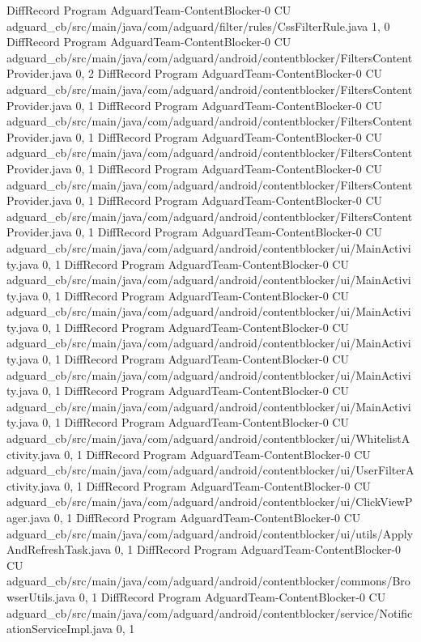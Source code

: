 DiffRecord Program AdguardTeam-ContentBlocker-0 CU adguard_cb/src/main/java/com/adguard/filter/rules/CssFilterRule.java  {1, 0}
DiffRecord Program AdguardTeam-ContentBlocker-0 CU adguard_cb/src/main/java/com/adguard/android/contentblocker/FiltersContentProvider.java  {0, 2}
DiffRecord Program AdguardTeam-ContentBlocker-0 CU adguard_cb/src/main/java/com/adguard/android/contentblocker/FiltersContentProvider.java  {0, 1}
DiffRecord Program AdguardTeam-ContentBlocker-0 CU adguard_cb/src/main/java/com/adguard/android/contentblocker/FiltersContentProvider.java  {0, 1}
DiffRecord Program AdguardTeam-ContentBlocker-0 CU adguard_cb/src/main/java/com/adguard/android/contentblocker/FiltersContentProvider.java  {0, 1}
DiffRecord Program AdguardTeam-ContentBlocker-0 CU adguard_cb/src/main/java/com/adguard/android/contentblocker/FiltersContentProvider.java  {0, 1}
DiffRecord Program AdguardTeam-ContentBlocker-0 CU adguard_cb/src/main/java/com/adguard/android/contentblocker/FiltersContentProvider.java  {0, 1}
DiffRecord Program AdguardTeam-ContentBlocker-0 CU adguard_cb/src/main/java/com/adguard/android/contentblocker/ui/MainActivity.java  {0, 1}
DiffRecord Program AdguardTeam-ContentBlocker-0 CU adguard_cb/src/main/java/com/adguard/android/contentblocker/ui/MainActivity.java  {0, 1}
DiffRecord Program AdguardTeam-ContentBlocker-0 CU adguard_cb/src/main/java/com/adguard/android/contentblocker/ui/MainActivity.java  {0, 1}
DiffRecord Program AdguardTeam-ContentBlocker-0 CU adguard_cb/src/main/java/com/adguard/android/contentblocker/ui/MainActivity.java  {0, 1}
DiffRecord Program AdguardTeam-ContentBlocker-0 CU adguard_cb/src/main/java/com/adguard/android/contentblocker/ui/MainActivity.java  {0, 1}
DiffRecord Program AdguardTeam-ContentBlocker-0 CU adguard_cb/src/main/java/com/adguard/android/contentblocker/ui/MainActivity.java  {0, 1}
DiffRecord Program AdguardTeam-ContentBlocker-0 CU adguard_cb/src/main/java/com/adguard/android/contentblocker/ui/WhitelistActivity.java  {0, 1}
DiffRecord Program AdguardTeam-ContentBlocker-0 CU adguard_cb/src/main/java/com/adguard/android/contentblocker/ui/UserFilterActivity.java  {0, 1}
DiffRecord Program AdguardTeam-ContentBlocker-0 CU adguard_cb/src/main/java/com/adguard/android/contentblocker/ui/ClickViewPager.java  {0, 1}
DiffRecord Program AdguardTeam-ContentBlocker-0 CU adguard_cb/src/main/java/com/adguard/android/contentblocker/ui/utils/ApplyAndRefreshTask.java  {0, 1}
DiffRecord Program AdguardTeam-ContentBlocker-0 CU adguard_cb/src/main/java/com/adguard/android/contentblocker/commons/BrowserUtils.java  {0, 1}
DiffRecord Program AdguardTeam-ContentBlocker-0 CU adguard_cb/src/main/java/com/adguard/android/contentblocker/service/NotificationServiceImpl.java  {0, 1}
